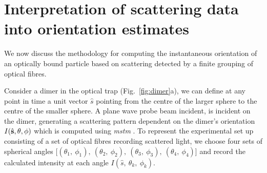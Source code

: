 \section{Interpretation of scattering data into orientation estimates}
We now discuss the methodology for computing the instantaneous 
orientation of an optically bound particle based on scattering
detected by a finite grouping of optical fibres. 

Consider a dimer in the optical trap (Fig.~\ref{fig:dimer}a), 
we can define at any point in time a unit vector $\hat{s}$ 
pointing from the centre of the larger sphere to the centre 
of the smaller sphere. A plane wave probe beam incident, 
is incident on the dimer, generating a scattering pattern
dependent on the dimer's orientation $I(\hat{\bf s}, 
\theta, \phi)$ which is computed using \textit{mstm} 
\cite{I.Mishchenko1996}. To represent the experimental set 
up consisting of a set of optical fibres recording scattered 
light, we choose four sets of spherical angles [$(\theta_1,\ 
\phi_1), \ (\theta_2,\ \phi_2), \ (\theta_3, \ \phi_3), \ 
(\theta_4,\ \phi_4)$] and record the calculated intensity at 
each angle $I(\hat{s},\ \theta_k,\ \phi_k)$. 
